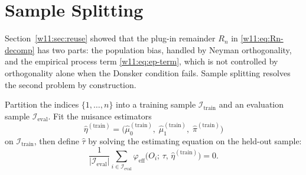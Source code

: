 \documentclass[master.tex]{subfiles}
\begin{document}
\section{Sample Splitting}
\label{w11:sec:splitting}

Section~\ref{w11:sec:reuse} showed that the plug-in remainder $R_n$
in \eqref{w11:eq:Rn-decomp} has two parts: the population bias,
handled by Neyman orthogonality, and the empirical process term
\eqref{w11:eq:ep-term}, which is not controlled by orthogonality
alone when the Donsker condition fails.  Sample splitting resolves
the second problem by construction.

Partition the indices $\{1,\ldots,n\}$ into a training sample
$\mathcal{I}_{\mathrm{train}}$ and an evaluation sample
$\mathcal{I}_{\mathrm{eval}}$.  Fit the nuisance estimators
\[
  \hat\eta^{(\mathrm{train})}
  =
  \bigl(
    \hat\mu_0^{(\mathrm{train})},\;
    \hat\mu_1^{(\mathrm{train})},\;
    \hat\pi^{(\mathrm{train})}
  \bigr)
\]
on $\mathcal{I}_{\mathrm{train}}$, then define $\hat\tau$ by
solving the estimating equation on the held-out sample:
\[
  \frac{1}{|\mathcal{I}_{\mathrm{eval}}|}
  \sum_{i \in \mathcal{I}_{\mathrm{eval}}}
  \varphi_{\mathrm{eff}}\!\bigl(O_i;\,\tau,\,\hat\eta^{(\mathrm{train})}\bigr)
  = 0.
\]
\end{document}
